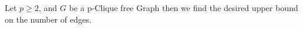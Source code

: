 
\begin{theorem}
    \label{thm:turans}
    \leanok
    Let $p \ge 2$, and $G$ be a p-Clique free Graph then we find the desired upper bound on the number of edges.
\end{theorem}

